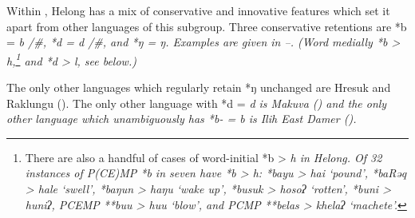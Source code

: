 Within , Helong has a mix of conservative
and innovative features which set
it apart from other languages of this subgroup.
Three conservative retentions are *b = \it{b} /{\#\gap},
*d = \it{d} /{\#\gap}, and *ŋ = \it{ŋ}.
Examples are given in --.
(Word medially *b > \it{h},\footnote{
		There are also a handful of cases of word-initial *b > \it{h} in Helong.
		Of 32 instances of P(CE)MP *b in \cite{Edwards2018b} seven have *b > \it{h}:
		*bayu > \it{hai} `pound', *baRəq > \it{hale} `swell', *baŋun > \it{haŋu} `wake up',
		*busuk > \it{hosoʔ} `rotten', *buni > \it{huniʔ}, PCEMP **buu > \it{huu} `blow',
		and PCMP **belas > \it{khelaʔ} `machete'.}
and *d > \it{l}, see below.)

The only other 
languages which regularly retain *ŋ unchanged
are Hresuk and Raklungu ().
The only other language with *d = \it{d} is Makuva ()
and the only other language which unambiguously
has *b- = \it{b} is Ilih East Damer ().

